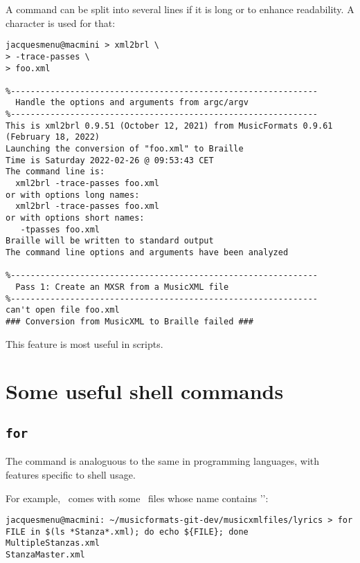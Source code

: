 A command can be split into several lines if it is long or to enhance readability. A \code{\textbackslash} character is used for that:
\begin{lstlisting}[language=Terminal]
jacquesmenu@macmini > xml2brl \
> -trace-passes \
> foo.xml

%--------------------------------------------------------------
  Handle the options and arguments from argc/argv
%--------------------------------------------------------------
This is xml2brl 0.9.51 (October 12, 2021) from MusicFormats 0.9.61 (February 18, 2022)
Launching the conversion of "foo.xml" to Braille
Time is Saturday 2022-02-26 @ 09:53:43 CET
The command line is:
  xml2brl -trace-passes foo.xml
or with options long names:
  xml2brl -trace-passes foo.xml
or with options short names:
   -tpasses foo.xml
Braille will be written to standard output
The command line options and arguments have been analyzed

%--------------------------------------------------------------
  Pass 1: Create an MXSR from a MusicXML file
%--------------------------------------------------------------
can't open file foo.xml
### Conversion from MusicXML to Braille failed ###
\end{lstlisting}

This feature is most useful in scripts.


\section{Some useful shell commands}

\subsection{{\tt for}}

The \code{for} command is analoguous to the same in programming languages, with features specific to shell usage.

For example, \mf\ comes with some \mxml\ files whose name contains '\code{Stanza}':
\begin{lstlisting}[language=Terminal]
jacquesmenu@macmini: ~/musicformats-git-dev/musicxmlfiles/lyrics > for FILE in $(ls *Stanza*.xml); do echo ${FILE}; done
MultipleStanzas.xml
StanzaMaster.xml
\end{lstlisting}

